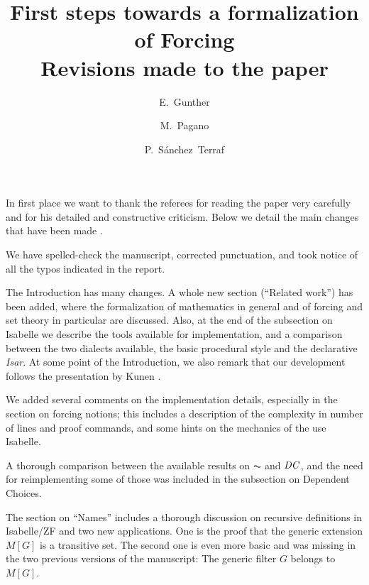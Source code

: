 \documentclass[11pt,english]{article}
\begin{document}
\title{First steps towards a formalization of Forcing
  \\ Revisions made to the paper}
\author{E.~Gunther \and  M.~Pagano \and P.~S\'anchez~Terraf
}
\date{}
\maketitle

In first place we want to thank the referees for reading the paper very
carefully and for his detailed and constructive criticism. Below we
detail the main changes that have been made%
.

We have spelled-check the manuscript, corrected punctuation, and took
notice of all the typos indicated in the report. 

The Introduction has many changes. A whole new section (``Related
work'') has been added, where the formalization of mathematics in
general and of forcing and set theory in particular are discussed.
Also, at the end of the subsection on Isabelle we describe the tools
available for implementation, and a comparison
between the two dialects available, the basic procedural style and the
declarative \emph{Isar}. At some point of the Introduction, we also
remark that our 
development follows the presentation by Kunen \cite{kunen2011set}. 

We added several comments on the implementation details, especially in
the section on forcing notions; this includes a description of the
complexity in number of lines and proof commands, and some hints on
the mechanics of the use Isabelle.

A thorough comparison between the available results on $\AC$ and
$\mathit{DC}$, and the need for reimplementing some of those was included in
the subsection on Dependent Choices.

The section on ``Names'' includes a thorough discussion on recursive
definitions in Isabelle/ZF and two new applications. One is the
proof that the generic
extension $M[G]$ is a transitive set. The second one is even more basic  and
was missing in the two previous versions of the manuscript: The
generic filter $G$ belongs to $M[G]$. 
%
%


\end{document}
